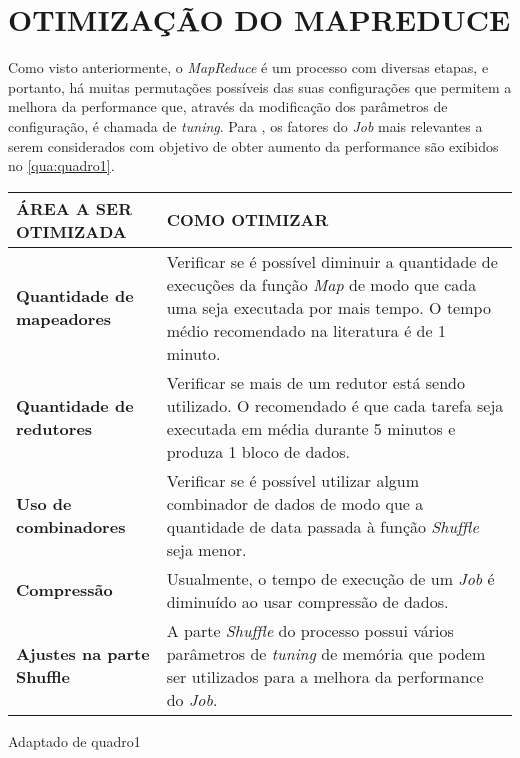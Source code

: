 \chapter{OTIMIZAÇÃO DO MAPREDUCE} \label{cha:otimizacaomapreduce}

Como visto anteriormente, o \textit{MapReduce} é um processo com diversas etapas, e portanto, há muitas permutações possíveis das suas configurações que permitem a melhora da performance que, através da modificação dos parâmetros de configuração, é chamada de \textit{tuning}. Para \textcite{HadoopBook15}, os fatores do \textit{Job} mais relevantes a serem considerados com objetivo de obter aumento da performance são exibidos no \autoref{qua:quadro1}.

{\footnotesize
  \centering
  \begin{tabular}{|p{50mm}|p{100mm}|}\hline
    \textbf{ÁREA A SER OTIMIZADA}     & \textbf{COMO OTIMIZAR}                                                                                                                                                                       \\\hline
    \textbf{Quantidade de mapeadores} & Verificar se é possível diminuir a quantidade de execuções da função \textit{Map} de modo que cada uma seja executada por mais tempo. O tempo médio recomendado na literatura é de 1 minuto. \\\hline
    \textbf{Quantidade de redutores}  & Verificar se mais de um redutor está sendo utilizado. O recomendado é que cada tarefa seja executada em média durante 5 minutos e produza 1 bloco de dados.                                  \\\hline
    \textbf{Uso de combinadores}      & Verificar se é possível utilizar algum combinador de dados de modo que a quantidade de data passada à função \textit{Shuffle} seja menor.                                                    \\\hline
    \textbf{Compressão}               & Usualmente, o tempo de execução de um \textit{Job} é diminuído ao usar compressão de dados.                                                                                                  \\\hline
    \textbf{Ajustes na parte Shuffle} & A parte \textit{Shuffle} do processo possui vários parâmetros de \textit{tuning} de memória que podem ser utilizados para a melhora da performance do \textit{Job}.                          \\\hline
  \end{tabular}}
{Adaptado de \cite{HadoopBook15}}{quadro1}{}{}




